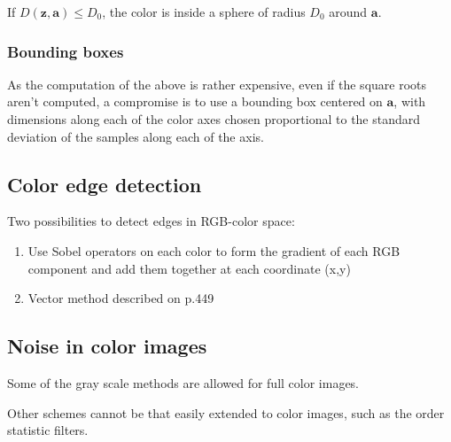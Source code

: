 If $D(\mathbf{z},\mathbf{a}) \leq D_0$, the color is inside a sphere of radius $D_0$ around $\mathbf{a}$. 

\subsubsection{Bounding boxes }
As the computation of the above is rather expensive, even if the square roots aren't computed, a compromise is to use a bounding box centered on $\mathbf{a}$, with dimensions along each of the color axes chosen proportional to the standard deviation of the samples along each of the axis.

\subsection{Color edge detection }
Two possibilities to detect edges in RGB-color space:
\begin{enumerate}
	\item Use Sobel operators on each color to form the gradient of each RGB component and add them together at each coordinate (x,y)
	\item Vector method described on p.449
\end{enumerate}

\subsection{Noise in color images }
Some of the gray scale methods are allowed for full color images.

Other schemes cannot be that easily extended to color images, such as the order statistic filters.